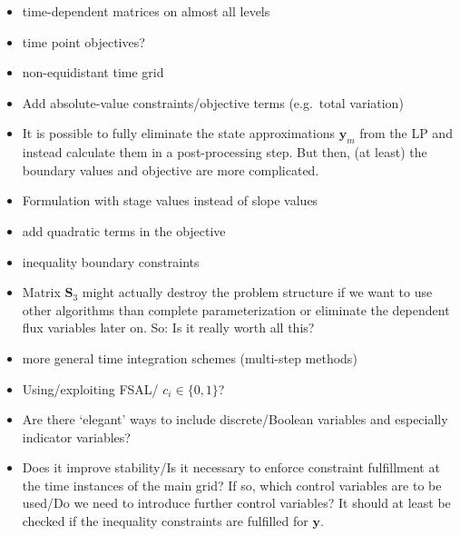 \documentclass{article}
\newcommand{\vectorfont}[1]{\boldsymbol{#1}}%
\newcommand{\matrixfont}[1]{\mathbf{#1}}%
\newcommand{\yvec}{\vectorfont{y}}
\newcommand{\Smat}{\matrixfont{S}}
\begin{document}
\begin{itemize}
  \item time-dependent matrices on almost all levels
  \item time point objectives?
	\item non-equidistant time grid
	\item Add absolute-value constraints/objective terms (e.g.\ total variation)
	\item It is possible to fully eliminate the state approximations $\yvec_{m}$ from the LP and instead calculate them in a post-processing step.
	But then, (at least) the boundary values and objective are more complicated.
	\item Formulation with stage values instead of slope values
	\item add quadratic terms in the objective
	\item inequality boundary constraints
	\item Matrix $\Smat_3$ might actually destroy the problem structure if we want to use other algorithms than complete parameterization or eliminate the dependent flux variables later on. So: Is it really worth all this?
	\item more general time integration schemes (multi-step methods)
	\item Using/exploiting FSAL/ $c_i \in \lbrace 0,1\rbrace$?
	\item Are there `elegant' ways to include discrete/Boolean variables and especially indicator variables?
	\item Does it improve stability/Is it necessary to enforce constraint fulfillment at the time instances of the main grid? If so, which control variables are to be used/Do we need to introduce further control variables?
	It should at least be checked if the inequality constraints are fulfilled for $\yvec$.
\end{itemize}
\end{document}
